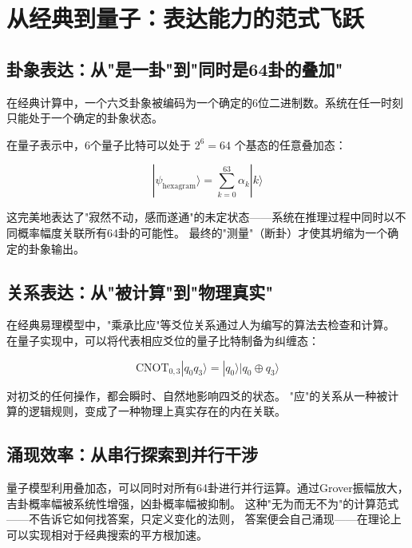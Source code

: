 \documentclass[twocolumn]{article}
\begin{document}
\section{从经典到量子：表达能力的范式飞跃}

\subsection{卦象表达：从"是一卦"到"同时是64卦的叠加"}

在经典计算中，一个六爻卦象被编码为一个确定的6位二进制数。系统在任一时刻只能处于一个确定的卦象状态。

在量子表示中，6个量子比特可以处于 $2^6 = 64$ 个基态的任意叠加态：

\begin{equation}
    |\psi_{\text{hexagram}}\rangle = \sum_{k=0}^{63} \alpha_k |k\rangle
\end{equation}

这完美地表达了"寂然不动，感而遂通"的未定状态——系统在推理过程中同时以不同概率幅度关联所有64卦的可能性。
最终的"测量"（断卦）才使其坍缩为一个确定的卦象输出。

\subsection{关系表达：从"被计算"到"物理真实"}

在经典易理模型中，"乘承比应"等爻位关系通过人为编写的算法去检查和计算。
在量子实现中，可以将代表相应爻位的量子比特制备为纠缠态：

\begin{equation}
    \text{CNOT}_{0,3} |q_0 q_3\rangle = |q_0\rangle |q_0 \oplus q_3\rangle
\end{equation}

对初爻的任何操作，都会瞬时、自然地影响四爻的状态。
"应"的关系从一种被计算的逻辑规则，变成了一种物理上真实存在的内在关联。

\subsection{涌现效率：从串行探索到并行干涉}

量子模型利用叠加态，可以同时对所有64卦进行并行运算。通过Grover振幅放大，
吉卦概率幅被系统性增强，凶卦概率幅被抑制。
这种"无为而无不为"的计算范式——不告诉它如何找答案，只定义变化的法则，
答案便会自己涌现——在理论上可以实现相对于经典搜索的平方根加速。
\end{document}
